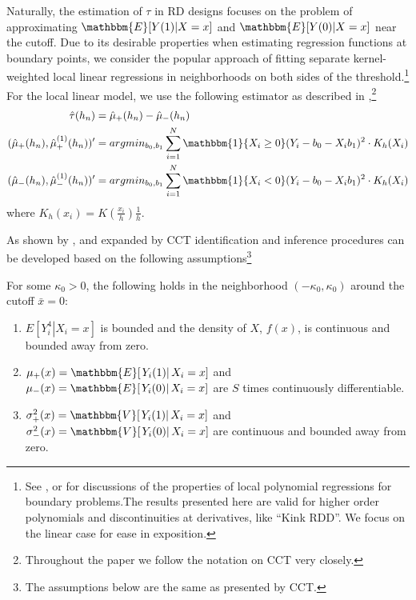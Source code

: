 \documentclass[12pt,fleqn]{article}
\begin{document}
Naturally, the estimation of $\tau$ in RD designs focuses on the 
problem of approximating $\mathbbm{E}[Y(1)|X=x]$ and $\mathbbm{E}[Y(0)|X=x]$ 
near the cutoff. Due to its desirable properties when estimating regression 
functions at boundary points, we consider the popular approach of fitting 
separate kernel-weighted local linear regressions in neighborhoods on both 
sides of the threshold.\footnote{See \cite{HTV2001}, \cite{Porter03} or
\cite{FanGijbels92} for discussions of the properties of local polynomial 
regressions for boundary problems.The results presented here are valid for
higher order polynomials and discontinuities at derivatives, like ``Kink RDD''. We focus on the linear case for ease in exposition.}
For the local linear model, we use the following estimator as described in 
\cite{calonico2014},\footnote{Throughout the paper we follow the
notation on CCT very closely.}
\begin{align*}
 \hat{\tau}(h_{n})&=\hat {\mu}_{+}(h_{n}) -\hat{\mu}_{-}(h_{n})\\
(\hat {\mu}_{+}(h_{n}),\hat {\mu}^{(1)}_{+}(h_{n}))'&= argmin_{b_{0},b_{1}} 
\sum_{i=1}^{N}\mathbbm{1}\{X_{i} \geq 0\}(Y_{i}-b_{0}-X_{i}b_{1})^{2} \cdot K_{h}(X_{i})\\
(\hat {\mu}_{-}(h_{n}),\hat {\mu}^{(1)}_{-}(h_{n}))' &= argmin_{b_{0},b_{1}}
\sum_{i=1}^{N}\mathbbm{1}\{X_{i} < 0\}(Y_{i}-b_{0}-X_{i}b_{1})^{2}\cdot K_{h}(X_{i})
\end{align*}
where $K_{h}(x_{i}) = K\left(\frac{x_{i}}{h}\right)\frac{1}{h}$.

As shown by \cite{HTV2001}, \cite{Porter03} and expanded by CCT identification and inference procedures can be developed based on the following assumptions\footnote{The assumptions below are the same as presented by CCT.}
\begin{assumption}\label{A1}
 For some $\kappa_{0} > 0$, the following holds in the neighborhood $(-\kappa_{0},\kappa_{0})$ around the cutoff $ \bar{x}= 0$:
 \begin{enumerate}
  \item $E[\left.Y_{i}^{4}\right|X_{i}=x]$ is bounded and the density of $X$, $f(x)$, is continuous and bounded away from zero.
  \item $\mu_{+}(x)=\mathbbm{E}[\left.Y_{i}(1)\right|X_{i}=x]$ and $\mu_{-}(x)=\mathbbm{E}[\left.Y_{i}(0)\right|X_{i}=x]$ are $S$ times continuously differentiable.
  \item $\sigma^{2}_{+}(x)=\mathbbm{V}[\left.Y_{i}(1)\right|X_{i}=x]$ and $\sigma^{2}_{-}(x)=\mathbbm{V}[\left.Y_{i}(0)\right|X_{i}=x]$ are continuous and bounded away from zero.
 \end{enumerate}
\end{assumption}
\end{document}
